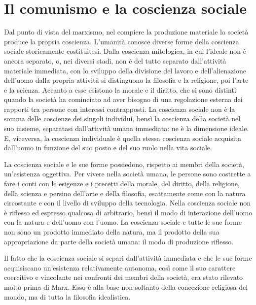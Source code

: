 \documentclass[../main]{subfiles}
\begin{document}
\ifSubfilesClassLoaded{\setcounter{page}{54}}{}
\section{Il comunismo e la coscienza sociale}
\label{sec:10_comunismo_coscienza}

Dal punto di vista del marxismo, nel compiere la produzione materiale la società produce la propria coscienza. L'umanità conosce diverse forme della coscienza sociale storicamente costituitesi. Dalla coscienza mitologica, in cui l'ideale non è ancora separato, o, nei diversi stadi, non è del tutto separato dall'attività materiale immediata, con lo sviluppo della divisione del lavoro e dell'alienazione dell'uomo dalla propria attività si distinguono la filosofia e la religione, poi l'arte e la scienza. Accanto a esse esistono la morale e il diritto, che si sono distinti quando la società ha cominciato ad aver bisogno di una regolazione esterna dei rapporti tra persone con interessi contrapposti. La coscienza sociale non è la somma delle coscienze dei singoli individui, bensì la coscienza della società nel suo insieme, separatasi dall'attività umana immediata: ne è la dimensione ideale. E, viceversa, la coscienza individuale è quella stessa coscienza sociale acquisita dall'uomo in funzione del suo posto e del suo ruolo nella vita sociale.

La coscienza sociale e le sue forme possiedono, rispetto ai membri della società, un'esistenza oggettiva. Per vivere nella società umana, le persone sono costrette a fare i conti con le esigenze e i precetti della morale, del diritto, della religione, della scienza e persino dell'arte e della filosofia, esattamente come con la natura circostante e con il livello di sviluppo della tecnologia. Nella coscienza sociale non è riflesso ed espresso qualcosa di arbitrario, bensì il modo di interazione dell'uomo con la natura e dell'uomo con l'uomo. La coscienza sociale e tutte le sue forme non sono un prodotto immediato della natura, ma il prodotto della sua appropriazione da parte della società umana: il modo di produzione riflesso.

Il fatto che la coscienza sociale si separi dall'attività immediata e che le sue forme acquisiscano un'esistenza relativamente autonoma, così come il suo carattere coercitivo e vincolante nei confronti dei membri della società, era stato rilevato molto prima di Marx. Esso è alla base non soltanto della concezione religiosa del mondo, ma di tutta la filosofia idealistica.
\end{document}
